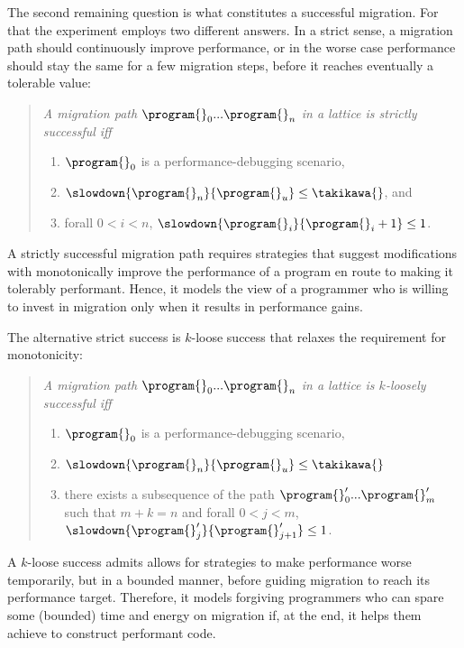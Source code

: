 The second remaining question is what constitutes a successful migration.
For that the experiment employs two different answers. In a strict
sense, a migration path should continuously improve performance, or
in the worse case performance should stay the same for a few migration steps, before
it reaches eventually  a tolerable value: 
\begin{quote}
\it A migration path ${\program{}_0}
  ... {\program{}_n}$ in a lattice 
  is \emph{strictly successful} iff 
  \begin{enumerate}
  \item  $\program{}_0$ is a performance-debugging scenario,
  \item $\slowdown{\program{}_n}{\program{}_u} \leq \takikawa{}$, and 
  \item forall $0 < i < n$, $\slowdown{\program{}_i}{\program{}_i+1} \leq 1$.
  \end{enumerate} 
\end{quote}
\noindent A strictly successful migration path requires
strategies that suggest modifications with monotonically improve the
performance of a program en route to making it tolerably performant.
Hence, it models the view of a programmer who is willing to invest in
migration only when it results in performance gains.

The alternative strict success is $k$-loose success that relaxes the
requirement for monotonicity: 
\begin{quote}
\it A migration path ${\program{}_0}
  ... {\program{}_n}$ in a lattice 
  is \emph{$k$-loosely successful} iff 
  \begin{enumerate}
  \item  $\program{}_0$ is a performance-debugging scenario,
  \item $\slowdown{\program{}_n}{\program{}_u} \leq \takikawa{}$  
  \item there exists a subsequence of the path 
    ${\program{}^\prime_0} ... {\program{}^\prime_m}$ such that
     $m + k = n$ and
      forall $0 < j < m$,
      $\slowdown{\program{}^\prime_j}{\program{}^\prime_{j+1}} \leq 1$.
  \end{enumerate} 
\end{quote}
\noindent A $k$-loose success admits allows for strategies to make
performance worse temporarily, but in a bounded manner, before guiding
migration to reach its performance target. Therefore, it models forgiving
programmers who can spare some (bounded) time and energy on migration if,
at the end, it helps them achieve to construct performant code. 





